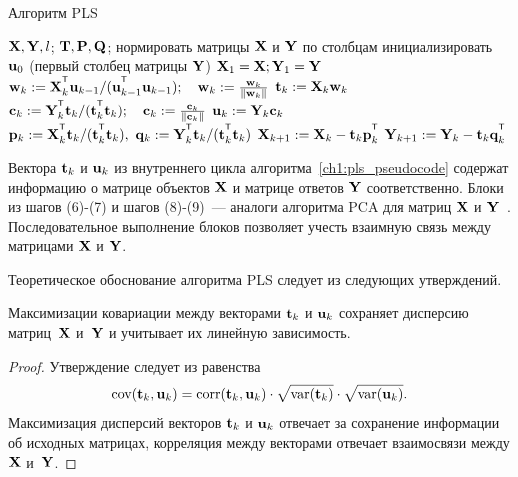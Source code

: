 \begin{algorithm}[h]
	\caption{Алгоритм PLS}
	\label{ch1:pls_pseudocode}
	\begin{algorithmic}[1]
		\REQUIRE $\mathbf{X}, \mathbf{Y}, l$;
		\ENSURE $\mathbf{T}, \mathbf{P}, \mathbf{Q}$;
		\STATE нормировать матрицы $\mathbf{X}$ и $\mathbf{Y}$ по столбцам
		\STATE инициализировать $\mathbf{u}_0$ (первый столбец матрицы $\mathbf{Y}$)
		\STATE $\mathbf{X}_1 = \mathbf{X}; \mathbf{Y}_1 = \mathbf{Y}$
		\REPEAT
		\vspace{0.1cm}
		\STATE $\bw_k := \bX_k^{\T} \bu_{k-1} / (\bu_{k-1}^{\T} \bu_{k-1}); \quad \bw_k: = \frac{\bw_k}{\| \bw_k \|}$
		\vspace{0.1cm}
		\STATE $\mathbf{t}_k := \mathbf{X}_k \mathbf{w}_k$
		\vspace{0.1cm}
		\STATE $\bc_k := \bY_k^{\T} \bt_k / (\bt_k^{\T} \bt_k); \quad \bc_k: = \frac{\bc_k}{\| \bc_k \|}$
		\vspace{0.1cm}
		\STATE $\mathbf{u}_k := \mathbf{Y}_k \mathbf{c}_k$
		\vspace{0.1cm}
		\STATE $\bp_k:= \bX_k^{\T}\bt_k/(\bt_k^{\T}\bt_k),\ 
		\bq_k := \bY_k^{\T}\bt_k/(\bt_k^{\T}\bt_k)$
		\vspace{0.2cm}
		\STATE $\bX_{k+1} :=  \bX_k - \bt_k \bp_k^{\T}$
		\vspace{0.2cm}
		\STATE $\bY_{k + 1} :=  \bY_k - \bt_k \bq_k^{\T}$ 
		\ENDFOR
	\end{algorithmic}
\end{algorithm}

Вектора $\mathbf{t}_k$ и $\mathbf{u}_k$ из внутреннего цикла алгоритма~\ref{ch1:pls_pseudocode}
содержат информацию о матрице объектов $\mathbf{X}$ и матрице ответов $\mathbf{Y}$ соответственно. 
Блоки из шагов (6)-(7) и шагов (8)-(9)~--- аналоги алгоритма PCA для матриц $\mathbf{X}$ и $\mathbf{Y}$~\cite{geladi1988pls}. 
Последовательное выполнение блоков позволяет учесть взаимную связь между матрицами $\mathbf{X}$ и $\mathbf{Y}$.

Теоретическое обоснование алгоритма PLS следует из следующих утверждений.
\begin{statement}
	Максимизации ковариации между векторами $\mathbf{t}_k$ и $\mathbf{u}_k$ сохраняет дисперсию матриц~$\mathbf{X}$ и~$\mathbf{Y}$ и учитывает их линейную зависимость.
\end{statement}
\begin{proof}
	Утверждение следует из равенства
	\[
	\text{cov} (\mathbf{t}_k, \mathbf{u}_k) = \text{corr} (\mathbf{t}_k, \mathbf{u}_k) \cdot \sqrt{\text{var}(\mathbf{t}_k)} \cdot \sqrt{\text{var}(\mathbf{u}_k)}.
	\]
	Максимизация дисперсий векторов $\mathbf{t}_k$ и $\mathbf{u}_k$ отвечает за сохранение информации об исходных матрицах, 
	корреляция между векторами отвечает взаимосвязи между $\mathbf{X}$ и~$\mathbf{Y}$. 
\end{proof}

